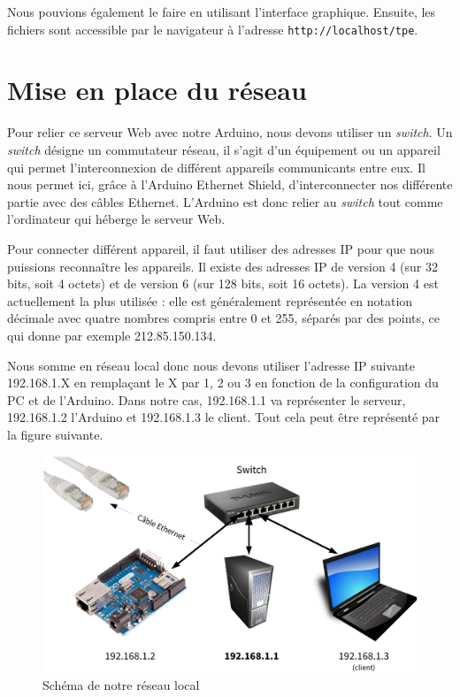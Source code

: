 
Nous pouvions également le faire en utilisant l'interface graphique. Ensuite, les fichiers sont accessible par le navigateur à l'adresse \verb-http://localhost/tpe-.

\section{Mise en place du réseau}

Pour relier ce serveur Web avec notre Arduino, nous devons utiliser un \emph{switch}. Un \emph{switch} désigne un commutateur réseau, il s'agit d'un équipement ou un appareil qui permet l'interconnexion de différent appareils communicants entre eux. Il nous permet ici, grâce à l'Arduino Ethernet Shield, d'interconnecter nos différente partie avec des câbles Ethernet. L'Arduino est donc relier au \emph{switch} tout comme l'ordinateur qui héberge le serveur Web.

Pour connecter différent appareil, il faut utiliser des adresses IP pour que nous puissions reconnaître les appareils. Il existe des adresses IP de version 4 (sur 32 bits, soit 4 octets) et de version 6 (sur 128 bits, soit 16 octets). La version 4 est actuellement la plus utilisée : elle est généralement représentée en notation décimale avec quatre nombres compris entre 0 et 255, séparés par des points, ce qui donne par exemple 212.85.150.134.

Nous somme en réseau local donc nous devons utiliser l'adresse IP suivante 192.168.1.X en remplaçant le X par 1, 2 ou 3 en fonction de la configuration du PC et de l'Arduino. Dans notre cas, 192.168.1.1 va représenter le serveur, 192.168.1.2 l'Arduino et 192.168.1.3 le client. Tout cela peut être représenté par la figure suivante.

\begin{figure}[!h]
	\centering
	\includegraphics[width=.8\linewidth]{Images/Schema_reseau}
	\caption{Schéma de notre réseau local}
\end{figure}

